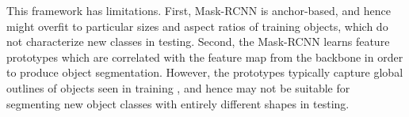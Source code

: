 \documentclass[final]{cvpr}
\begin{document}
This framework has limitations. First, Mask-RCNN is anchor-based, and hence might overfit to particular sizes and aspect ratios of training objects, which do not characterize new classes in testing. Second, the Mask-RCNN learns feature prototypes \cite{he2017mask} which are correlated with the feature map from the backbone in order to produce object segmentation. However, the prototypes  typically capture global outlines of objects seen in training \cite{he2017mask}, and hence may not be suitable for segmenting new object classes with entirely different shapes in testing.






\end{document}

